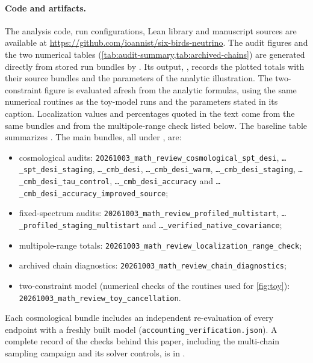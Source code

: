 \documentclass[11pt]{article}
\theoremstyle{remark}
\numberwithin{equation}{section}
\begin{document}
\paragraph{Code and artifacts.}
The analysis code, run configurations, Lean library and manuscript sources are available at \url{https://github.com/ioannist/six-birds-neutrino}. The audit figures and the two numerical tables (\cref{tab:audit-summary,tab:archived-chains}) are generated directly from stored run bundles by . Its output, , records the plotted totals with their source bundles and the parameters of the analytic illustration. The two-constraint figure is evaluated afresh from the analytic formulas, using the same numerical routines as the toy-model runs and the parameters stated in its caption. Localization values and percentages quoted in the text come from the same bundles and from the multipole-range check listed below. The baseline table summarizes \cite{arxiv2601_16277}. The main bundles, all under , are:
\begin{itemize}[leftmargin=*, itemsep=1pt]
  \item cosmological audits: \texttt{20261003\_\allowbreak{}math\_\allowbreak{}review\_\allowbreak{}cosmological\_\allowbreak{}spt\_\allowbreak{}desi}, \texttt{\dots\_\allowbreak{}spt\_\allowbreak{}desi\_\allowbreak{}staging}, \texttt{\dots\_\allowbreak{}cmb\_\allowbreak{}desi}, \texttt{\dots\_\allowbreak{}cmb\_\allowbreak{}desi\_\allowbreak{}warm}, \texttt{\dots\_\allowbreak{}cmb\_\allowbreak{}desi\_\allowbreak{}staging}, \texttt{\dots\_\allowbreak{}cmb\_\allowbreak{}desi\_\allowbreak{}tau\_\allowbreak{}control}, \texttt{\dots\_\allowbreak{}cmb\_\allowbreak{}desi\_\allowbreak{}accuracy} and \texttt{\dots\_\allowbreak{}cmb\_\allowbreak{}desi\_\allowbreak{}accuracy\_\allowbreak{}improved\_\allowbreak{}source};
  \item fixed-spectrum audits: \texttt{20261003\_\allowbreak{}math\_\allowbreak{}review\_\allowbreak{}profiled\_\allowbreak{}multistart}, \texttt{\dots\_\allowbreak{}profiled\_\allowbreak{}staging\_\allowbreak{}multistart} and \texttt{\dots\_\allowbreak{}verified\_\allowbreak{}native\_\allowbreak{}covariance};
  \item multipole-range totals: \texttt{20261003\_\allowbreak{}math\_\allowbreak{}review\_\allowbreak{}localization\_\allowbreak{}range\_\allowbreak{}check};
  \item archived chain diagnostics: \texttt{20261003\_\allowbreak{}math\_\allowbreak{}review\_\allowbreak{}chain\_\allowbreak{}diagnostics};
  \item two-constraint model (numerical checks of the routines used for \cref{fig:toy}): \texttt{20261003\_\allowbreak{}math\_\allowbreak{}review\_\allowbreak{}toy\_\allowbreak{}cancellation}.
\end{itemize}
Each cosmological bundle includes an independent re-evaluation of every endpoint with a freshly built model (\texttt{accounting\_\allowbreak{}verification.json}). A complete record of the checks behind this paper, including the multi-chain sampling campaign and its solver controls, is in .
\end{document}
